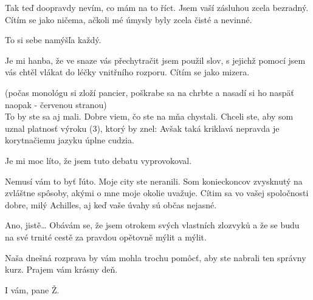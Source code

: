 \documentclass[12pt]{article}
\begin{document}
\begin{description}[itemsep=0pt]
\item[A:] Tak teď doopravdy nevím, co mám na to říct. Jsem vaší zásluhou
    zcela bezradný. Cítím se jako ničema, ačkoli mé úmysly byly zcela čisté
    a nevinné.

\item[Ž:] To si sebe namýšľa každý.

\item[A:] Je mi hanba, že ve snaze vás přechytračit jsem použil slov, s jejichž
    pomocí jsem vás chtěl vlákat do léčky vnitřního rozporu. Cítím se jako mizera.

\item[Ž:] (počas monológu si zloží pancier, poškrabe sa na chrbte a nasadí si ho naspäť naopak - červenou stranou)\\
    To by ste sa aj mali. Dobre viem, čo ste na mňa chystali. Chceli ste, aby som 
    uznal platnosť výroku (3), ktorý by znel:  Avšak taká kriklavá nepravda je korytnačiemu jazyku úplne cudzia. 

\item[A:] Je mi moc líto, že jsem tuto debatu vyprovokoval.

\item[Ž:] Nemusí vám to byť ľúto. Moje city ste neranili. Som konieckoncov zvysknutý na 
    zvláštne spôsoby, akými o mne moje okolie uvažuje. Cítim sa vo vašej spoločnosti dobre, 
    milý Achilles, aj keď vaše úvahy sú občas nejasné.

\item[A:] Ano, jistě… Obávám se, že jsem otrokem svých vlastních zlozvyků a že
    se budu na své trnité cestě za pravdou opětovně mýlit a mýlit.

\item[Ž:] Naša dnešná rozprava by vám mohla trochu pomôcť, aby ste nabrali ten správny kurz. 
    Prajem vám krásny deň.

\item[A:] I vám, pane Ž.
\end{description}
\end{document}
